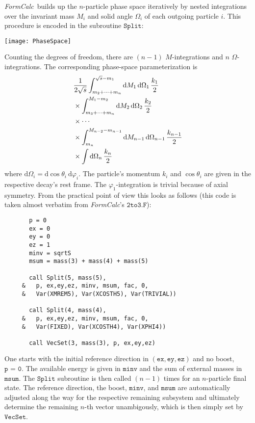 \documentclass[twoside,11pt]{article}
\makeatletter
\def\indextt#1{\index{#1@\texttt{#1}}}
\def\FC{\textit{FormCalc}}
\def\Code#1{\ensuremath{\texttt{#1}}}
\def\rd{\mathrm{d}}
\makeatother
\begin{document}
\FC\ builds up the $n$-particle phase space iteratively by nested
integrations over the invariant mass $M_i$ and solid angle $\Omega_i$ of
each outgoing particle $i$.  This procedure is encoded in the subroutine
\Code{Split}:
\begin{center}
\texttt{[image: PhaseSpace]}
\end{center}
Counting the degrees of freedom, there are $(n - 1)$ $M$-integrations 
and $n$ $\Omega$-integrations.  The corresponding phase-space 
parameterization is
\begin{align*}
&\frac 1{2\sqrt s}\int_{m_2+\dots+m_n}^{\sqrt s - m_1}
  \rd M_1\,\rd\Omega_1\,\frac{k_1}{2} \\
&\times\int_{m_3+\dots+m_n}^{M_1 - m_2}
  \rd M_2\,\rd\Omega_2\,\frac{k_2}{2} \\
&\times\cdots \notag \\
&\times\int_{m_n}^{M_{n-2} - m_{n-1}}
  \rd M_{n-1}\,\rd\Omega_{n-1}\,\frac{k_{n-1}}{2} \\
&\times\int
  \rd\Omega_n\,\frac{k_n}{2}
\end{align*}
\indextt{Split}%
where $\rd\Omega_i = \rd\cos\theta_i\:\rd\varphi_i$.  The particle's
momentum $k_i$ and $\cos\theta_i$ are given in the respective decay's
rest frame.  The $\varphi_1$-integration is trivial because of axial 
symmetry.  From the practical point of view this looks as follows
(this code is taken almost verbatim from \FC's \Code{2to3.F}):
\begin{verbatim}
       p = 0
       ex = 0
       ey = 0
       ez = 1
       minv = sqrtS
       msum = mass(3) + mass(4) + mass(5)

       call Split(5, mass(5),
     &   p, ex,ey,ez, minv, msum, fac, 0, 
     &   Var(XMREM5), Var(XCOSTH5), Var(TRIVIAL))

       call Split(4, mass(4),
     &   p, ex,ey,ez, minv, msum, fac, 0,
     &   Var(FIXED), Var(XCOSTH4), Var(XPHI4))

       call VecSet(3, mass(3), p, ex,ey,ez)
\end{verbatim}
One starts with the initial reference direction in $(\Code{ex},
\Code{ey}, \Code{ez})$ and no boost, \Code{p = 0}.  The available energy
is given in \Code{minv} and the sum of external masses in \Code{msum}.
The \Code{Split} subroutine is then called $(n - 1)$ times for an
$n$-particle final state.  The reference direction, the boost,
\Code{minv}, and \Code{msum} are automatically adjusted along the way
for the respective remaining subsystem and ultimately determine the
remaining $n$-th vector unambigously, which is then simply set by
\Code{VecSet}.
\end{document}
